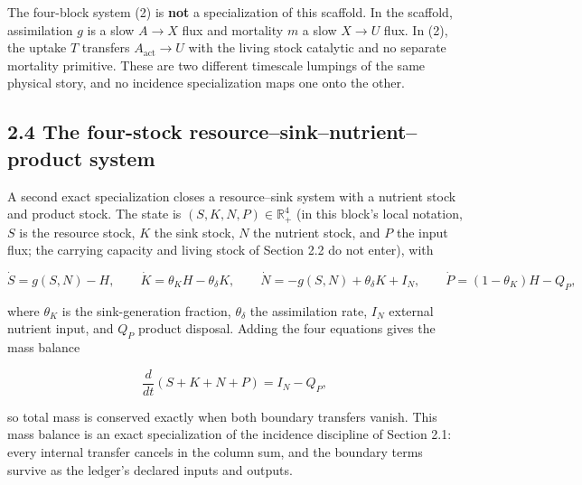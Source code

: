 \documentclass[11pt]{article}
\begin{document}
The four-block system (2) is \textbf{not} a specialization of this scaffold. In the scaffold, assimilation \(g\) is a slow \(A\to X\) flux and mortality \(m\) a slow \(X\to U\) flux. In (2), the uptake \(T\) transfers \(A_{\mathrm{act}}\to U\) with the living stock catalytic and no separate mortality primitive. These are two different timescale lumpings of the same physical story, and no incidence specialization maps one onto the other.

\subsection*{2.4 The four-stock resource--sink--nutrient--product system}\label{24-the-four-stock-resource--sink--nutrient--product-system}

A second exact specialization closes a resource--sink system with a nutrient stock and product stock. The state is \((S,\allowbreak{} K,\allowbreak{} N,\allowbreak{} P) \in \mathbb{R}^4_+\allowbreak{}\) (in this block's local notation, \(S\) is the resource stock, \(K\) the sink stock, \(N\) the nutrient stock, and \(P\) the input flux; the carrying capacity and living stock of Section 2.2 do not enter), with 

$$\dot S = g(S,N) - H, \qquad \dot K = \theta_K H - \theta_\delta K, \qquad \dot N = -g(S,N) + \theta_\delta K + I_N, \qquad \dot P = (1 - \theta_K)H - Q_P,$$

 where \(\theta_K\) is the sink-generation fraction, \(\theta_\delta\) the assimilation rate, \(I_N\) external nutrient input, and \(Q_P\) product disposal. Adding the four equations gives the mass balance 

$$\frac{d}{dt}(S + K + N + P) = I_N - Q_P,$$

 so total mass is conserved exactly when both boundary transfers vanish. This mass balance is an exact specialization of the incidence discipline of Section 2.1: every internal transfer cancels in the column sum, and the boundary terms survive as the ledger's declared inputs and outputs.
\end{document}
